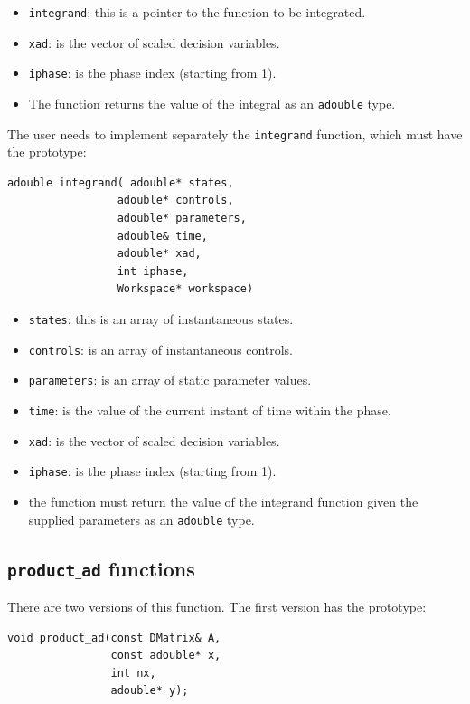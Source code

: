 \documentclass[a4paper,11pt]{report}    %
\begin{document}
\begin{itemize}
 \item \verb|integrand|:  this is a pointer to the function to be integrated. 
 \item \verb|xad|: is the vector of scaled decision variables.
 \item \verb|iphase|:  is the phase index (starting from 1).
 \item The function returns the value of the integral as an \verb|adouble| type.
\end{itemize}

The user needs to implement separately the \texttt{integrand} function,
which must have the prototype:

\begin{verbatim}
adouble integrand( adouble* states, 
                 adouble* controls, 
                 adouble* parameters, 
                 adouble& time, 
                 adouble* xad, 
                 int iphase,
                 Workspace* workspace)
\end{verbatim}

\begin{itemize}
 \item \verb|states|:  this is an array of instantaneous states.
 \item \verb|controls|: is an array of instantaneous controls.
 \item \verb|parameters|: is an array of static parameter values.
 \item \verb|time|:  is the value of the current instant of time within the phase.
 \item \verb|xad|: is the vector of scaled decision variables.
 \item \verb|iphase|:  is the phase index (starting from 1).
 \item the function must return the value of the integrand function given the supplied parameters as an \verb|adouble| type.
\end{itemize}




\subsection{ \texttt{product$\_$ad} functions}

There are two versions of this function. The first version has the prototype:

\begin{verbatim}
void product_ad(const DMatrix& A, 
                const adouble* x, 
                int nx, 
                adouble* y); 
\end{verbatim}
\end{document}
